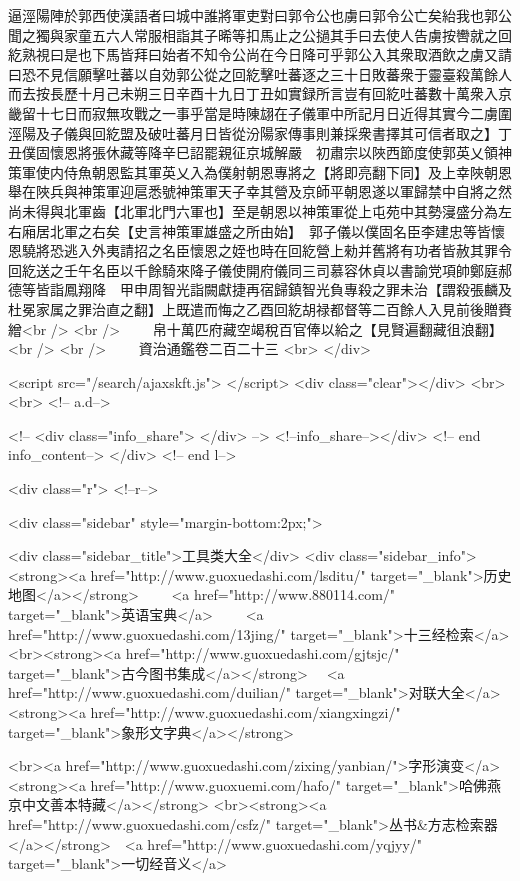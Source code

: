 逼涇陽陣於郭西使漢語者曰城中誰將軍吏對曰郭令公也虜曰郭令公亡矣紿我也郭公聞之獨與家童五六人常服相詣其子晞等扣馬止之公撾其手曰去使人告虜按轡就之回紇熟視曰是也下馬皆拜曰始者不知令公尚在今日降可乎郭公入其衆取酒飲之虜又請曰恐不見信願擊吐蕃以自効郭公從之回紇擊吐蕃逐之三十日敗蕃衆于靈臺殺萬餘人而去按長歷十月己未朔三日辛酉十九日丁丑如實録所言豈有回紇吐蕃數十萬衆入京畿留十七日而寂無攻戰之一事乎當是時陳翃在子儀軍中所記月日近得其實今二虜圍涇陽及子儀與回紇盟及破吐蕃月日皆從汾陽家傳事則兼採衆書擇其可信者取之】丁丑僕固懷恩將張休藏等降辛巳詔罷親征京城解嚴　初肅宗以陜西節度使郭英乂領神策軍使内侍魚朝恩監其軍英乂入為僕射朝恩專將之【將即亮翻下同】及上幸陜朝恩舉在陜兵與神策軍迎扈悉號神策軍天子幸其營及京師平朝恩遂以軍歸禁中自將之然尚未得與北軍齒【北軍北門六軍也】至是朝恩以神策軍從上屯苑中其勢寖盛分為左右廂居北軍之右矣【史言神策軍雄盛之所由始】　郭子儀以僕固名臣李建忠等皆懷恩驍將恐逃入外夷請招之名臣懷恩之姪也時在回紇營上勑并舊將有功者皆赦其罪令回紇送之壬午名臣以千餘騎來降子儀使開府儀同三司慕容休貞以書諭党項帥鄭庭郝德等皆詣鳳翔降　甲申周智光詣闕獻捷再宿歸鎮智光負專殺之罪未治【謂殺張麟及杜冕家属之罪治直之翻】上既遣而悔之乙酉回紇胡禄都督等二百餘人入見前後贈賚繒<br />
<br />
　　帛十萬匹府藏空竭稅百官俸以給之【見賢遍翻藏徂浪翻】<br />
<br />
　　資治通鑑卷二百二十三  <br>
   </div> 

<script src="/search/ajaxskft.js"> </script>
 <div class="clear"></div>
<br>
<br>
 <!-- a.d-->

 <!--
<div class="info_share">
</div> 
-->
 <!--info_share--></div>   <!-- end info_content-->
  </div> <!-- end l-->

<div class="r">   <!--r-->



<div class="sidebar"  style="margin-bottom:2px;">

 
<div class="sidebar_title">工具类大全</div>
<div class="sidebar_info">
<strong><a href="http://www.guoxuedashi.com/lsditu/" target="_blank">历史地图</a></strong>　　
<a href="http://www.880114.com/" target="_blank">英语宝典</a>　　
<a href="http://www.guoxuedashi.com/13jing/" target="_blank">十三经检索</a>　
<br><strong><a href="http://www.guoxuedashi.com/gjtsjc/" target="_blank">古今图书集成</a></strong>　
<a href="http://www.guoxuedashi.com/duilian/" target="_blank">对联大全</a>　<strong><a href="http://www.guoxuedashi.com/xiangxingzi/" target="_blank">象形文字典</a></strong>　

<br><a href="http://www.guoxuedashi.com/zixing/yanbian/">字形演变</a>　　<strong><a href="http://www.guoxuemi.com/hafo/" target="_blank">哈佛燕京中文善本特藏</a></strong>
<br><strong><a href="http://www.guoxuedashi.com/csfz/" target="_blank">丛书&方志检索器</a></strong>　<a href="http://www.guoxuedashi.com/yqjyy/" target="_blank">一切经音义</a>　　

